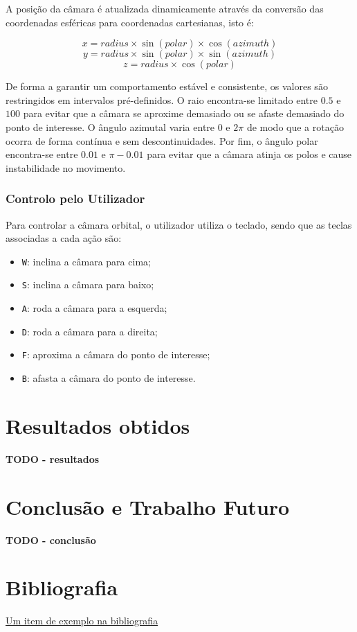 \documentclass[12pt, a4paper]{article}
\begin{document}
A posição da câmara é atualizada dinamicamente através da conversão das coordenadas esféricas para
coordenadas cartesianas, isto é:

$$x = radius \times \sin(polar) \times \cos(azimuth)$$
$$y = radius \times \sin(polar) \times \sin(azimuth)$$
$$z = radius \times \cos(polar)$$

De forma a garantir um comportamento estável e consistente, os valores são restringidos em
intervalos pré-definidos. O raio encontra-se limitado entre $0.5$ e $100$ para evitar que a câmara
se aproxime demasiado ou se afaste demasiado do ponto de interesse. O ângulo azimutal varia entre
$0$ e $2\pi$ de modo que a rotação ocorra de forma contínua e sem descontinuidades. Por fim, o
ângulo polar encontra-se entre $0.01$ e $\pi - 0.01$ para evitar que a câmara atinja os polos e
cause instabilidade no movimento.

\subsubsection{Controlo pelo Utilizador}

Para controlar a câmara orbital, o utilizador utiliza o teclado, sendo que as teclas associadas a
cada ação são:
\begin{itemize}
    \item \texttt{W}: inclina a câmara para cima;
    \item \texttt{S}: inclina a câmara para baixo;
    \item \texttt{A}: roda a câmara para a esquerda;
    \item \texttt{D}: roda a câmara para a direita;
    \item \texttt{F}: aproxima a câmara do ponto de interesse;
    \item \texttt{B}: afasta a câmara do ponto de interesse.
\end{itemize}

\section{Resultados obtidos}

\textbf{\color{red} TODO - resultados}

\section{Conclusão e Trabalho Futuro}

\textbf{\color{red} TODO - conclusão}

\begingroup
\section{Bibliografia}
\renewcommand{\section}[2]{}

\begin{thebibliography}{9}
        \href{https://youtu.be/dQw4w9WgXcQ}{Um item de exemplo na bibliografia}
\end{thebibliography}
\endgroup
\end{document}
